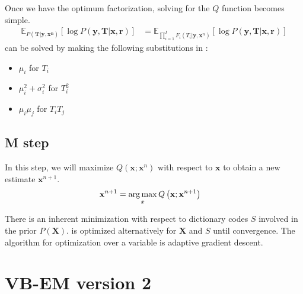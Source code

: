 Once we have the optimum factorization, solving for the $Q$ function becomes simple.
\begin{align}
    \mathbb{E}_{P( \mathbf{T} | \mathbf{y}, \mathbf{x^n})} \left[ \log P \left( \mathbf{y}, \mathbf{T} | \mathbf{x}, \mathbf{r} \right) \right] &= \mathbb{E}_{ \prod_{i=1}^{I} F_i (T_i | \mathbf{y}, \mathbf{x}^n) } \left[ \log P \left( \mathbf{y}, \mathbf{T} | \mathbf{x}, \mathbf{r} \right) \right] \label{eqn:Qsimplevbem1}
\end{align}
 can be solved by making the following substitutions in :
\begin{itemize}
    \item $\mu_i$ for $T_i$
    \item $\mu_i^2 + \sigma_i^2$ for $T_i^2$
    \item $\mu_i \mu_j$ for $T_i T_j$ 
\end{itemize}


\subsection{M step}
In this step, we will maximize $Q(\mathbf{x}; \mathbf{x}^n)$ with respect to $\mathbf{x}$ to obtain a new estimate $\mathbf{x}^{n+1}$.
\begin{align}
    \mathbf{x}^{n+1} &= \operatorname*{arg\,max}_{x} Q \left( \mathbf{x}; \mathbf{x}^{n+1} \right) \label{eqn:Mvbem1}
\end{align}

There is an inherent minimization with respect to dictionary codes $S$ involved in the prior $ P \left(\mathbf{X}\right) $.  is optimized alternatively for $\mathbf{X}$ and $S$ until convergence. The algorithm for optimization over a variable is adaptive gradient descent.

\section{VB-EM version 2}
